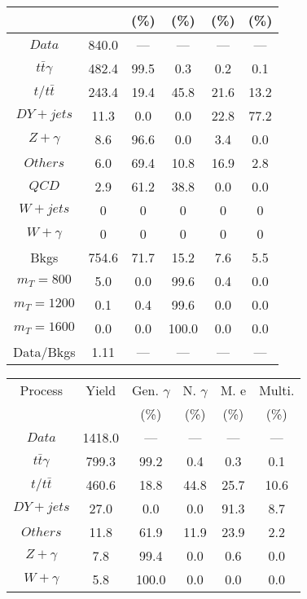 \begin{figure}
\begin{minipage}[c]{0.32\textwidth}
{\begin{tabular}{cccccc}
 &  & (\%) & (\%) & (\%) & (\%)  \\
\hline
                                                                      $ Data $ &  840.0 &  --- &  --- &  --- &  ---\\
$ t\bar{t}\gamma $ &  482.4 &  99.5 &  0.3 &  0.2 &  0.1\\
$ t/t\bar{t} $ &  243.4 &  19.4 &  45.8 &  21.6 &  13.2\\
$ DY+jets $ &  11.3 &  0.0 &  0.0 &  22.8 &  77.2\\
$ Z+\gamma $ &  8.6 &  96.6 &  0.0 &  3.4 &  0.0\\
$ Others $ &  6.0 &  69.4 &  10.8 &  16.9 &  2.8\\
$ QCD $ &  2.9 &  61.2 &  38.8 &  0.0 &  0.0\\
$ W+jets $ &  0 &  0 &  0 &  0 &  0\\
$ W+\gamma $ &  0 &  0 &  0 &  0 &  0\\
Bkgs &  754.6 &  71.7 &  15.2 &  7.6 &  5.5\\
$ m_{T} = 800 $ &  5.0 &  0.0 &  99.6 &  0.4 &  0.0\\
$ m_{T} = 1200 $ &  0.1 &  0.4 &  99.6 &  0.0 &  0.0\\
$ m_{T} = 1600 $ &  0.0 &  0.0 &  100.0 &  0.0 &  0.0\\
Data/Bkgs &  1.11 &  --- &  --- &  --- &  ---\\
\hline
\end{tabular}
}
\end{minipage}
\begin{minipage}[c]{0.32\textwidth}
\centering
\tiny{
\begin{tabular}{cccccc}
\hline
Process & Yield & Gen. $\gamma$ & N. $\gamma$ & M. e & Multi. \\
 &  & (\%) & (\%) & (\%) & (\%)  \\
\hline
                                                                      $ Data $ &  1418.0 &  --- &  --- &  --- &  ---\\
$ t\bar{t}\gamma $ &  799.3 &  99.2 &  0.4 &  0.3 &  0.1\\
$ t/t\bar{t} $ &  460.6 &  18.8 &  44.8 &  25.7 &  10.6\\
$ DY+jets $ &  27.0 &  0.0 &  0.0 &  91.3 &  8.7\\
$ Others $ &  11.8 &  61.9 &  11.9 &  23.9 &  2.2\\
$ Z+\gamma $ &  7.8 &  99.4 &  0.0 &  0.6 &  0.0\\
$ W+\gamma $ &  5.8 &  100.0 &  0.0 &  0.0 &  0.0\\

\end{tabular}}
\end{minipage}
\end{figure}
